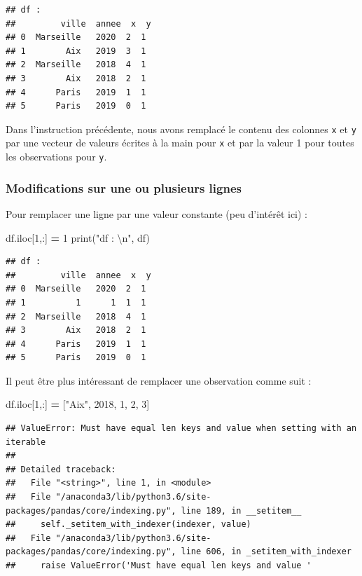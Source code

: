 \documentclass[12pt,]{book}
\newenvironment{Shaded}{\begin{snugshade}}{\end{snugshade}}
\newcommand{\DecValTok}[1]{\textcolor[rgb]{0.00,0.00,0.81}{#1}}
\newcommand{\CharTok}[1]{\textcolor[rgb]{0.31,0.60,0.02}{#1}}
\newcommand{\StringTok}[1]{\textcolor[rgb]{0.31,0.60,0.02}{#1}}
\newcommand{\OperatorTok}[1]{\textcolor[rgb]{0.81,0.36,0.00}{\textbf{#1}}}
\newcommand{\BuiltInTok}[1]{#1}
\newcommand{\NormalTok}[1]{#1}
\numberwithin{equation}{section}
\numberwithin{countremarque}{section}
\begin{document}
\begin{lstlisting}
## df : 
##         ville  annee  x  y
## 0  Marseille   2020  2  1
## 1        Aix   2019  3  1
## 2  Marseille   2018  4  1
## 3        Aix   2018  2  1
## 4      Paris   2019  1  1
## 5      Paris   2019  0  1
\end{lstlisting}

Dans l'instruction précédente, nous avons remplacé le contenu des
colonnes \texttt{x} et \texttt{y} par une vecteur de valeurs écrites à
la main pour \texttt{x} et par la valeur 1 pour toutes les observations
pour \texttt{y}.

\subsubsection{Modifications sur une ou plusieurs
lignes}\label{modifications-sur-une-ou-plusieurs-lignes}

Pour remplacer une ligne par une valeur constante (peu d'intérêt ici) :

\begin{Shaded}
\begin{Highlighting}[]
\NormalTok{df.iloc[}\DecValTok{1}\NormalTok{,:] }\OperatorTok{=} \DecValTok{1}
\BuiltInTok{print}\NormalTok{(}\StringTok{"df : }\CharTok{\textbackslash{}n}\StringTok{"}\NormalTok{, df)}
\end{Highlighting}
\end{Shaded}

\begin{lstlisting}
## df : 
##         ville  annee  x  y
## 0  Marseille   2020  2  1
## 1          1      1  1  1
## 2  Marseille   2018  4  1
## 3        Aix   2018  2  1
## 4      Paris   2019  1  1
## 5      Paris   2019  0  1
\end{lstlisting}

Il peut être plus intéressant de remplacer une observation comme suit :

\begin{Shaded}
\begin{Highlighting}[]
\NormalTok{df.iloc[}\DecValTok{1}\NormalTok{,:] }\OperatorTok{=}\NormalTok{ [}\StringTok{"Aix"}\NormalTok{, }\DecValTok{2018}\NormalTok{, }\DecValTok{1}\NormalTok{, }\DecValTok{2}\NormalTok{, }\DecValTok{3}\NormalTok{]}
\end{Highlighting}
\end{Shaded}

\begin{lstlisting}
## ValueError: Must have equal len keys and value when setting with an iterable
## 
## Detailed traceback: 
##   File "<string>", line 1, in <module>
##   File "/anaconda3/lib/python3.6/site-packages/pandas/core/indexing.py", line 189, in __setitem__
##     self._setitem_with_indexer(indexer, value)
##   File "/anaconda3/lib/python3.6/site-packages/pandas/core/indexing.py", line 606, in _setitem_with_indexer
##     raise ValueError('Must have equal len keys and value '
\end{lstlisting}
\end{document}
